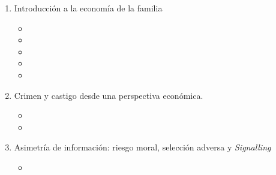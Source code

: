 \documentclass[10pt,a4paper]{article}
\begin{document}
\begin{enumerate}
	\item Introducción a la economía de la familia
 	\begin{itemize}
 		\item {}
		\item {}
		\item {}
		\item {}
		\item {}
	\end{itemize}
	
	\item  Crimen y castigo desde una perspectiva económica.
  	\begin{itemize}
 		\item {}
		\item {}
	\end{itemize}
	\item Asimetría de información: riesgo moral, selección adversa y \textit{Signalling}
  	\begin{itemize}
 		\item {}
	\end{itemize}
\end{enumerate}
\end{document}
